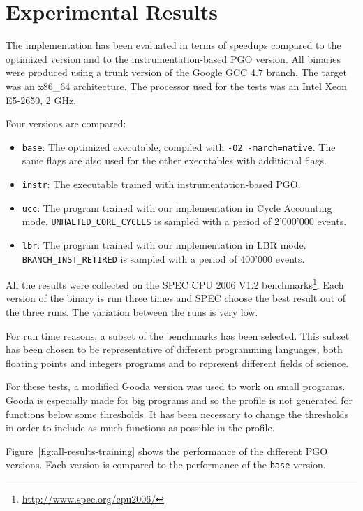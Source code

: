 \documentclass[9pt,english,twocolumn,letter]{article}
\begin{document}
\section{Experimental Results}
\label{sec:results}

The implementation has been evaluated in terms of speedups compared to the optimized version and to the instrumentation-based PGO version. All binaries were produced using a trunk version of the Google GCC 4.7 branch. The target was an x86\_64 architecture. The processor used for the tests was an Intel\textsuperscript{\textregistered} Xeon\textsuperscript{\texttrademark} E5-2650, 2 GHz.

Four versions are compared:
\begin{itemize}
    \item \texttt{base}: The optimized executable, compiled with \texttt{-O2 -march=native}. The same flags are also used for the other executables with additional flags.
    \item \texttt{instr}: The executable trained with instrumentation-based PGO.
    \item \texttt{ucc}: The program trained with our implementation in Cycle Accounting mode. \texttt{UNHALTED\_CORE\_CYCLES} is sampled with a period of 2'000'000 events.
    \item \texttt{lbr}: The program trained with our implementation in LBR mode. \texttt{BRANCH\_INST\_RETIRED} is sampled with a period of 400'000 events.
\end{itemize}

All the results were collected on the SPEC CPU 2006 V1.2 benchmarks\footnote{\url{http://www.spec.org/cpu2006/}}. Each version of the binary is run three times and SPEC choose the best result out of the three runs. The variation between the runs is very low.

For run time reasons, a subset of the benchmarks has been selected. This subset has been chosen to be representative of different programming languages, both floating points and integers programs and to represent different fields of science.

For these tests, a modified Gooda version was used to work on small programs. Gooda is especially made for big programs and so the profile is not generated for functions below some thresholds. It has been necessary to change the thresholds in order to include as much functions as possible in the profile.

Figure~\ref{fig:all-results-training} shows the performance of the different PGO versions. Each version is compared to the performance of the \texttt{base} version.
\end{document}
